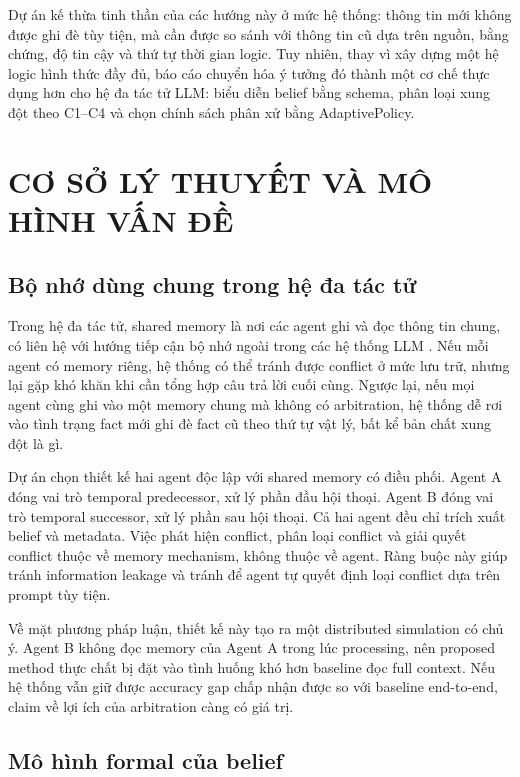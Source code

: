 \documentclass[12pt,a4paper]{article}
\begin{document}
Dự án kế thừa tinh thần của các hướng này ở mức hệ thống: thông tin mới không được ghi đè tùy tiện, mà cần được so sánh với thông tin cũ dựa trên nguồn, bằng chứng, độ tin cậy và thứ tự thời gian logic. Tuy nhiên, thay vì xây dựng một hệ logic hình thức đầy đủ, báo cáo chuyển hóa ý tưởng đó thành một cơ chế thực dụng hơn cho hệ đa tác tử LLM: biểu diễn belief bằng schema, phân loại xung đột theo C1--C4 và chọn chính sách phân xử bằng AdaptivePolicy.

\section{CƠ SỞ LÝ THUYẾT VÀ MÔ HÌNH VẤN ĐỀ}

\subsection{Bộ nhớ dùng chung trong hệ đa tác tử}

Trong hệ đa tác tử, shared memory là nơi các agent ghi và đọc thông tin chung, có liên hệ với hướng tiếp cận bộ nhớ ngoài trong các hệ thống LLM \cite{lewis2020rag,packer2023memgpt}. Nếu mỗi agent có memory riêng, hệ thống có thể tránh được conflict ở mức lưu trữ, nhưng lại gặp khó khăn khi cần tổng hợp câu trả lời cuối cùng. Ngược lại, nếu mọi agent cùng ghi vào một memory chung mà không có arbitration, hệ thống dễ rơi vào tình trạng fact mới ghi đè fact cũ theo thứ tự vật lý, bất kể bản chất xung đột là gì.

Dự án chọn thiết kế hai agent độc lập với shared memory có điều phối. Agent A đóng vai trò temporal predecessor, xử lý phần đầu hội thoại. Agent B đóng vai trò temporal successor, xử lý phần sau hội thoại. Cả hai agent đều chỉ trích xuất belief và metadata. Việc phát hiện conflict, phân loại conflict và giải quyết conflict thuộc về memory mechanism, không thuộc về agent. Ràng buộc này giúp tránh information leakage và tránh để agent tự quyết định loại conflict dựa trên prompt tùy tiện.

Về mặt phương pháp luận, thiết kế này tạo ra một distributed simulation có chủ ý. Agent B không đọc memory của Agent A trong lúc processing, nên proposed method thực chất bị đặt vào tình huống khó hơn baseline đọc full context. Nếu hệ thống vẫn giữ được accuracy gap chấp nhận được so với baseline end-to-end, claim về lợi ích của arbitration càng có giá trị.

\subsection{Mô hình formal của belief}
\end{document}
